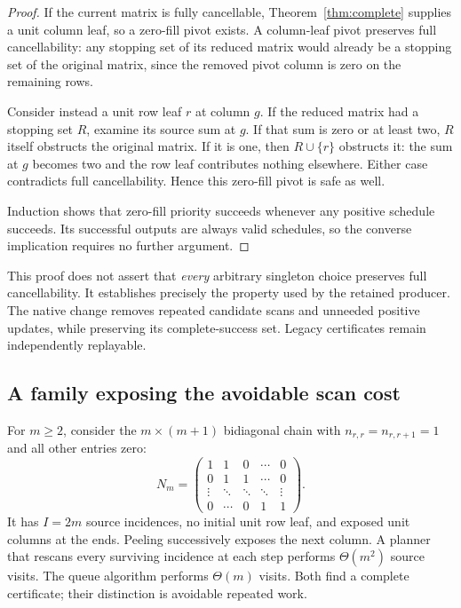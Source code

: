 \begin{proof}
If the current matrix is fully cancellable, Theorem~\ref{thm:complete}
supplies a unit column leaf, so a zero-fill pivot exists. A column-leaf
pivot preserves full cancellability: any stopping set of its reduced
matrix would already be a stopping set of the original matrix, since the
removed pivot column is zero on the remaining rows.

Consider instead a unit row leaf $r$ at column $g$. If the reduced matrix
had a stopping set $R$, examine its source sum at $g$. If that sum is zero
or at least two, $R$ itself obstructs the original matrix. If it is one,
then $R\cup\{r\}$ obstructs it: the sum at $g$ becomes two and the row
leaf contributes nothing elsewhere. Either case contradicts full
cancellability. Hence this zero-fill pivot is safe as well.

Induction shows that zero-fill priority succeeds whenever any positive
schedule succeeds. Its successful outputs are always valid schedules, so
the converse implication requires no further argument.
\end{proof}

This proof does not assert that \emph{every} arbitrary singleton choice
preserves full cancellability. It establishes precisely the property used
by the retained producer. The native change removes repeated candidate
scans and unneeded positive updates, while preserving its complete-success
set. Legacy certificates remain independently replayable.

\subsection{A family exposing the avoidable scan cost}

For $m\ge2$, consider the $m\times(m+1)$ bidiagonal chain with
$n_{r,r}=n_{r,r+1}=1$ and all other entries zero:
\[
 N_m=\begin{pmatrix}
 1&1&0&\cdots&0\\
 0&1&1&\cdots&0\\
 \vdots&\ddots&\ddots&\ddots&\vdots\\
 0&\cdots&0&1&1
 \end{pmatrix}.
\]
It has $I=2m$ source incidences, no initial unit row leaf, and exposed unit
columns at the ends. Peeling successively exposes the next column.
A planner that rescans every surviving incidence at each
step performs $\Theta(m^2)$ source visits. The queue algorithm performs
$\Theta(m)$ visits. Both find a complete certificate; their distinction
is avoidable repeated work.

